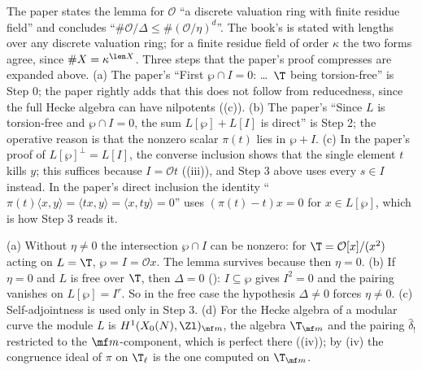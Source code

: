 \begin{remark}\label{rem:congruence:ddt417-commentary}
The paper states the lemma for $\mathcal O$ ``a discrete valuation ring with finite residue field'' and concludes ``$\#\mathcal O/\Delta\le\#(\mathcal O/\eta)^d$''. The book's  is stated with
lengths over any discrete valuation ring; for a finite residue field of order $\kappa$ the two forms agree, since $\#X=\kappa^{\len X}$. Three steps that the paper's proof compresses are
expanded above. (a) The paper's ``First $\wp\cap I=0$: \dots\ $\T$ being torsion-free'' is Step 0; the paper rightly adds that this does not follow from reducedness, since the
full Hecke algebra can have nilpotents ((c)). (b) The paper's ``Since $L$ is torsion-free and $\wp\cap I=0$, the sum $L[\wp]+L[I]$ is direct'' is Step 2; the operative
reason is that the nonzero scalar $\pi(t)$ lies in $\wp+I$. (c) In the paper's proof of $L[\wp]^\perp=L[I]$, the converse inclusion shows that the single element $t$ kills $y$; this suffices
because $I=\mathcal O t$ ((iii)), and Step 3 above uses every $s\in I$ instead. In the paper's direct inclusion the identity
``$\pi(t)\langle x,y\rangle=\langle tx,y\rangle=\langle x,ty\rangle=0$'' uses $(\pi(t)-t)x=0$ for $x\in L[\wp]$, which is how Step 3 reads it.
\end{remark}

\begin{remark}\label{rem:congruence:ddt417-hypotheses}
(a) Without $\eta\ne0$ the intersection $\wp\cap I$ can be nonzero: for $\T=\mathcal O[x]/(x^2)$ acting on $L=\T$, $\wp=I=\mathcal Ox$. The lemma survives because then $\eta=0$. (b) If $\eta=0$ and $L$
is free over $\T$, then $\Delta=0$ (): $I\subseteq\wp$ gives $I^2=0$ and the pairing vanishes on $L[\wp]=I^r$. So in the free case the hypothesis $\Delta\ne0$ forces
$\eta\ne0$. (c) Self-adjointness is used only in Step 3. (d) For the Hecke algebra of a modular curve the module $L$ is $H^1(X_0(N),\Zl)_{\mf m}$, the algebra $\T_{\mf m}$ and the
pairing $\hat\delta_!$ restricted to the $\mf m$-component, which is perfect there ((iv)); by (iv) the
congruence ideal of $\pi$ on $\T_\ell$ is the one computed on $\T_{\mf m}$.
\end{remark}


